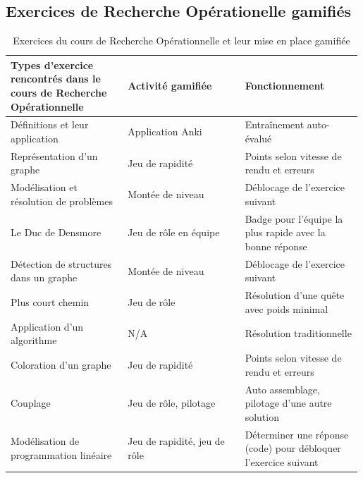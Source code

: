 \subsection{Exercices de Recherche Opérationelle gamifiés}
\begin{table}
    \begin{center}
        \begin{tabular}{|p{0.33\linewidth}|p{0.33\linewidth}|p{0.33\linewidth}|}
        \hline
        \textbf{Types d'exercice rencontrés dans le cours  de Recherche Opérationnelle} & \textbf{Activité gamifiée} & \textbf{Fonctionnement} \\ \hline
         Définitions et leur application &  Application Anki &  Entraînement auto-évalué \\ \hline
         Représentation d'un graphe &  Jeu de rapidité &  Points selon vitesse de rendu et erreurs \\ \hline
         Modélisation et résolution de problèmes &  Montée de niveau &  Déblocage de l'exercice suivant \\ \hline
         Le Duc de Densmore &  Jeu de rôle en équipe & Badge pour l'équipe la plus rapide avec la bonne réponse \\ \hline
         Détection de structures dans un graphe &  Montée de niveau &  Déblocage de l'exercice suivant \\ \hline
         Plus court chemin &  Jeu de rôle &  Résolution d'une quête avec poids minimal \\ \hline
         Application d'un algorithme &  N/A &  Résolution traditionnelle \\ \hline
         Coloration d'un graphe & Jeu de rapidité & Points selon vitesse de rendu et erreurs \\ \hline
         Couplage &  Jeu de rôle, pilotage &  Auto assemblage, pilotage d'une autre solution \\ \hline
         Modélisation de programmation linéaire &  Jeu de rapidité, jeu de rôle &  Déterminer une réponse (code) pour débloquer l'exercice suivant \\ \hline
        \end{tabular}
        \label{tab:OR_Exercices_Application}
        \caption{Exercices du cours de Recherche Opérationnelle et leur mise en place gamifiée}
    \end{center}
\end{table}


